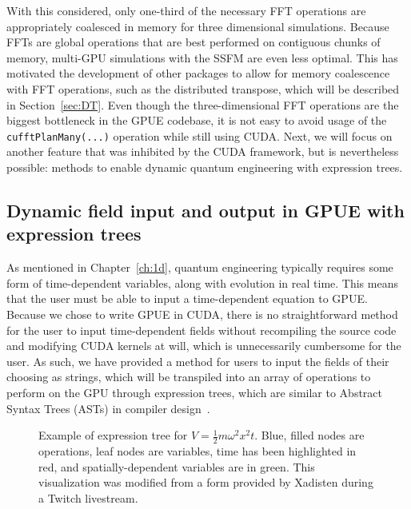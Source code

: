 
With this considered, only one-third of the necessary FFT operations are appropriately coalesced in memory for three dimensional simulations.
Because FFTs are global operations that are best performed on contiguous chunks of memory, multi-GPU simulations with the SSFM are even less optimal.
This has motivated the development of other packages to allow for memory coalescence with FFT operations, such as the distributed transpose, which will be described in Section~\ref{sec:DT}.
Even though the three-dimensional FFT operations are the biggest bottleneck in the GPUE codebase, it is not easy to avoid usage of the \texttt{cufftPlanMany(...)} operation while still using CUDA.
Next, we will focus on another feature that was inhibited by the CUDA framework, but is nevertheless possible: methods to enable dynamic quantum engineering with expression trees.

\subsection{Dynamic field input and output in GPUE with expression trees}

\label{sec:expr_trees}
As mentioned in Chapter~\ref{ch:1d}, quantum engineering typically requires some form of time-dependent variables, along with evolution in real time.
This means that the user must be able to input a time-dependent equation to GPUE.
Because we chose to write GPUE in CUDA, there is no straightforward method for the user to input time-dependent fields without recompiling the source code and modifying CUDA kernels at will, which is unnecessarily cumbersome for the user.
As such, we have provided a method for users to input the fields of their choosing as strings, which will be transpiled into an array of operations to perform on the GPU through expression trees, which are similar to Abstract Syntax Trees (ASTs) in compiler design~\cite{cohen1991, reyes2011}.

\begin{figure}
\center 
\caption{
Example of expression tree for $V=\frac{1}{2}m \omega^2 x^2 t$.
Blue, filled nodes are operations, leaf nodes are variables, time has been highlighted in red, and spatially-dependent variables are in green.
This visualization was modified from a form provided by Xadisten during a Twitch livestream.
}
\label{fig:expr_tree}
\end{figure}

